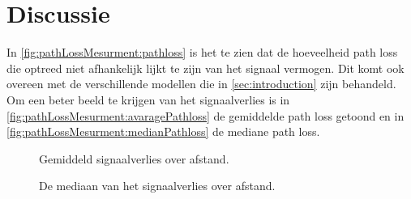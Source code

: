 \section{Discussie}


In \autoref{fig:pathLossMesurment:pathloss} is het te zien dat de hoeveelheid path loss die optreed niet afhankelijk lijkt te zijn van het signaal vermogen. Dit komt ook overeen met de verschillende modellen die in \autoref{sec:introduction} zijn behandeld. Om een beter beeld te krijgen van het signaalverlies is in \autoref{fig:pathLossMesurment:avaragePathloss} de gemiddelde path loss getoond en in \autoref{fig:pathLossMesurment:medianPathloss} de  mediane path loss.
\begin{figure}[ht]
    \centering
{}

\caption{Gemiddeld signaalverlies over afstand.}
\label{fig:pathLossMesurment:avaragePathloss}

\end{figure}
\begin{figure}[ht]
    \centering
{}

\caption{De mediaan van het signaalverlies over afstand.}
\label{fig:pathLossMesurment:medianPathloss}

\end{figure}

